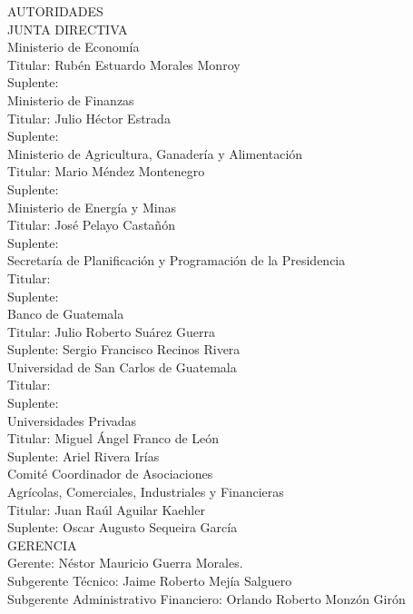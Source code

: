 \begin{center}
{\Bold \LARGE AUTORIDADES}\\[1cm]


{\Bold \large \color{color1!89!black} JUNTA  DIRECTIVA} \\[0.4cm]


{\Bold Ministerio de Economía}\\
Titular: Rubén Estuardo Morales Monroy\\
Suplente: \\[0.4cm]


{\Bold Ministerio de Finanzas}\\
Titular: Julio Héctor Estrada\\
Suplente: \\[0.4cm]


{\Bold Ministerio de Agricultura, Ganadería y Alimentación}\\
Titular: Mario Méndez Montenegro\\
Suplente: \\[0.4cm]


{\Bold Ministerio de Energía y Minas}\\
Titular: José Pelayo Castañón\\
Suplente: \\[0.4cm]


{\Bold Secretaría de Planificación y Programación de la Presidencia}\\
Titular: \\
Suplente: \\[0.4cm]


{\Bold Banco de Guatemala}\\
Titular: Julio Roberto Suárez Guerra\\
Suplente: Sergio Francisco Recinos Rivera\\[0.4cm]



{\Bold Universidad de San Carlos de Guatemala}\\
Titular: \\
Suplente: \\[0.4cm]


{\Bold Universidades Privadas}\\
Titular: Miguel Ángel Franco de León\\
Suplente: Ariel Rivera Irías\\[0.4cm]


{\Bold Comité Coordinador de Asociaciones\\ Agrícolas, Comerciales, Industriales y Financieras}\\
Titular: Juan Raúl Aguilar Kaehler\\
Suplente:  Oscar Augusto Sequeira García\\[0.8cm]


{\Bold \large \color{color1!89!black} GERENCIA}\\[0.2cm]
Gerente: Néstor Mauricio Guerra Morales.\\
Subgerente Técnico: Jaime Roberto Mejía Salguero\\
Subgerente Administrativo Financiero: Orlando Roberto Monzón Girón\\


\end{center}

